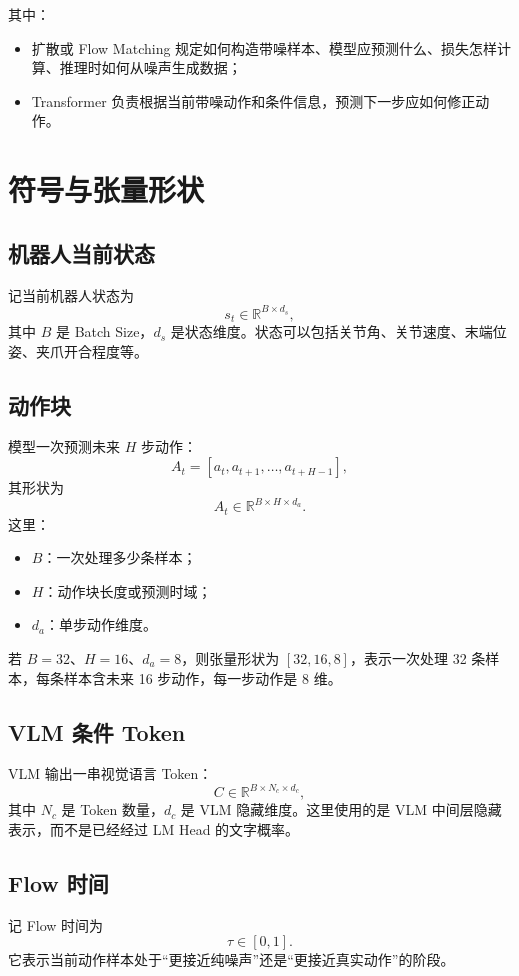 \documentclass[UTF8,11pt,a4paper]{ctexart}
\begin{document}
其中：
\begin{itemize}
  \item 扩散或 Flow Matching 规定如何构造带噪样本、模型应预测什么、损失怎样计算、推理时如何从噪声生成数据；
  \item Transformer 负责根据当前带噪动作和条件信息，预测下一步应如何修正动作。
\end{itemize}

\section{符号与张量形状}

\subsection{机器人当前状态}
记当前机器人状态为
\[
s_t\in\mathbb{R}^{B\times d_s},
\]
其中 $B$ 是 Batch Size，$d_s$ 是状态维度。状态可以包括关节角、关节速度、末端位姿、夹爪开合程度等。

\subsection{动作块}
模型一次预测未来 $H$ 步动作：
\[
A_t=[a_t,a_{t+1},\ldots,a_{t+H-1}],
\]
其形状为
\[
A_t\in\mathbb{R}^{B\times H\times d_a}.
\]
这里：
\begin{itemize}
  \item $B$：一次处理多少条样本；
  \item $H$：动作块长度或预测时域；
  \item $d_a$：单步动作维度。
\end{itemize}

\begin{examplebox}
若 $B=32$、$H=16$、$d_a=8$，则张量形状为 $[32,16,8]$，表示一次处理 32 条样本，每条样本含未来 16 步动作，每一步动作是 8 维。
\end{examplebox}

\subsection{VLM 条件 Token}
VLM 输出一串视觉语言 Token：
\[
C\in\mathbb{R}^{B\times N_c\times d_c},
\]
其中 $N_c$ 是 Token 数量，$d_c$ 是 VLM 隐藏维度。这里使用的是 VLM 中间层隐藏表示，而不是已经经过 LM Head 的文字概率。

\subsection{Flow 时间}
记 Flow 时间为
\[
\tau\in[0,1].
\]
它表示当前动作样本处于“更接近纯噪声”还是“更接近真实动作”的阶段。
\end{document}
